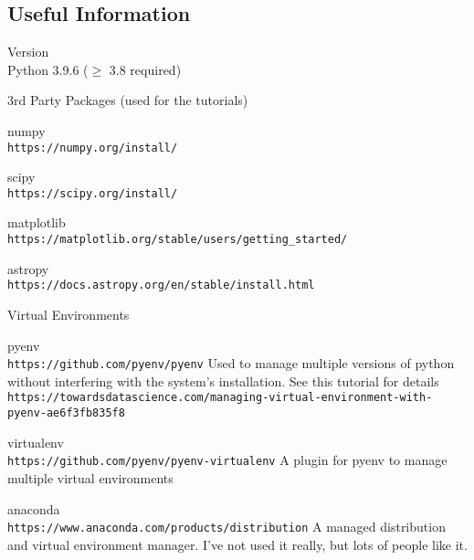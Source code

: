 
\subsection{Useful Information}
\begin{description}
	\item{Version\\} Python 3.9.6 ($\geq$ 3.8 required)
	\item{3rd Party Packages (used for the tutorials)}
		\begin{description}
			\item{numpy\\} \verb|https://numpy.org/install/|
			\item{scipy\\} \verb|https://scipy.org/install/|
			\item{matplotlib\\} \verb|https://matplotlib.org/stable/users/getting_started/|
			\item{astropy\\} \verb|https://docs.astropy.org/en/stable/install.html|
		\end{description}
	\item{Virtual Environments}
	\begin{description}
		\item{pyenv\\} \verb|https://github.com/pyenv/pyenv| Used to manage multiple versions of python without interfering with the system's installation. See this tutorial for details \texttt{https://towardsdatascience.com/managing-\linebreak[0]virtual-\linebreak[0]environment-\linebreak[0]with-\linebreak[0]pyenv-\linebreak[0]ae6f3fb835f8}
		\item{virtualenv\\} \verb|https://github.com/pyenv/pyenv-virtualenv| A plugin for pyenv to manage multiple virtual environments
		\item{anaconda\\} \verb|https://www.anaconda.com/products/distribution| A managed distribution and virtual environment manager. I've not used it really, but lots of people like it.
	\end{description}
	
\end{description} 



